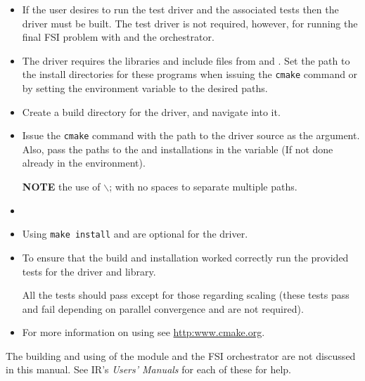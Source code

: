 \begin{itemize}
\item If the user desires to run the test driver and the associated tests then the driver must be built. The test driver is not required, however, for running the final FSI problem with \foam and the orchestrator.
\item The \irprogram driver requires the libraries and include files from \impact and . Set the path to the install directories for these programs when issuing the \texttt{cmake} command or by setting the environment variable  to the desired paths.

\item Create a build directory for the \irprogram driver, and navigate into it.
\item{Issue the \texttt{cmake} command with the path to the \irprogram driver source as the argument. Also, pass the paths to the \impact and  installations in the  variable (If not done already in the environment).} 


\textbf{NOTE} the use of $\backslash$; with no spaces to separate multiple paths.

\item {}
\item Using \texttt{make install} and  are optional for the driver.
\item To ensure that the build and installation worked correctly run the provided tests for the driver and library.


All the tests should pass except for those regarding scaling (these tests pass and fail depending on parallel convergence and are not required).
\item For more information on using  see \url{http:www.cmake.org}.
\end{itemize}


The building and using of the \foam module and the FSI orchestrator are not discussed in this manual. See IR's \textit{Users' Manuals} for each of these for help.

